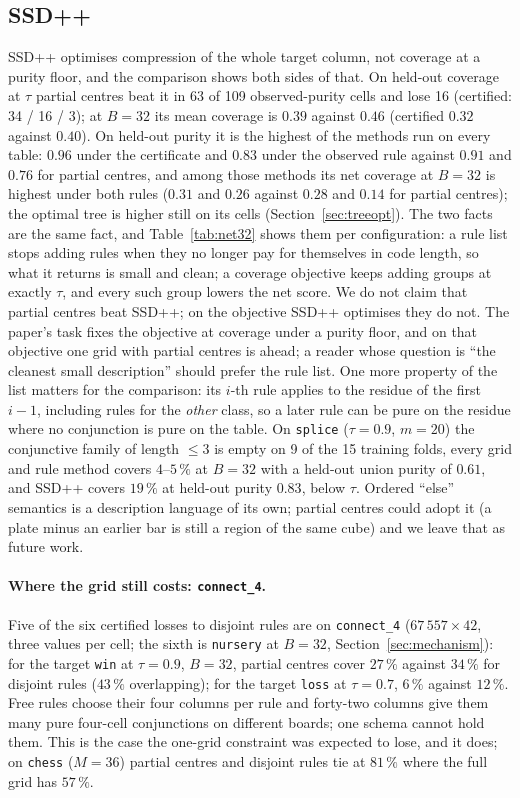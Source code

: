 \documentclass[11pt]{article}
\begin{document}
\subsection{SSD++}\label{sec:ssdpp}
SSD++ optimises compression of the whole target column, not coverage at a purity floor, and the comparison shows both sides of that. On held-out coverage at $\tau$ partial centres beat it in 63 of 109 observed-purity cells and lose 16 (certified: 34 / 16 / 3); at $B=32$ its mean coverage is $0.39$ against $0.46$ (certified $0.32$ against $0.40$). On held-out purity it is the highest of the methods run on every table: $0.96$ under the certificate and $0.83$ under the observed rule against $0.91$ and $0.76$ for partial centres, and among those methods its net coverage at $B=32$ is highest under both rules ($0.31$ and $0.26$ against $0.28$ and $0.14$ for partial centres); the optimal tree is higher still on its cells (Section~\ref{sec:treeopt}). The two facts are the same fact, and Table~\ref{tab:net32} shows them per configuration: a rule list stops adding rules when they no longer pay for themselves in code length, so what it returns is small and clean; a coverage objective keeps adding groups at exactly $\tau$, and every such group lowers the net score. We do not claim that partial centres beat SSD++; on the objective SSD++ optimises they do not. The paper's task fixes the objective at coverage under a purity floor, and on that objective one grid with partial centres is ahead; a reader whose question is ``the cleanest small description'' should prefer the rule list. One more property of the list matters for the comparison: its $i$-th rule applies to the residue of the first $i-1$, including rules for the \emph{other} class, so a later rule can be pure on the residue where no conjunction is pure on the table. On \texttt{splice} ($\tau=0.9$, $m=20$) the conjunctive family of length $\le3$ is empty on 9 of the 15 training folds, every grid and rule method covers $4$--$5\,\%$ at $B=32$ with a held-out union purity of $0.61$, and SSD++ covers $19\,\%$ at held-out purity $0.83$, below $\tau$. Ordered ``else'' semantics is a description language of its own; partial centres could adopt it (a plate minus an earlier bar is still a region of the same cube) and we leave that as future work.

\paragraph{Where the grid still costs: \texttt{connect\_4}.} Five of the six certified losses to disjoint rules are on \texttt{connect\_4} ($67\,557\times42$, three values per cell; the sixth is \texttt{nursery} at $B=32$, Section~\ref{sec:mechanism}): for the target \texttt{win} at $\tau=0.9$, $B=32$, partial centres cover $27\,\%$ against $34\,\%$ for disjoint rules ($43\,\%$ overlapping); for the target \texttt{loss} at $\tau=0.7$, $6\,\%$ against $12\,\%$. Free rules choose their four columns per rule and forty-two columns give them many pure four-cell conjunctions on different boards; one schema cannot hold them. This is the case the one-grid constraint was expected to lose, and it does; on \texttt{chess} ($M=36$) partial centres and disjoint rules tie at $81\,\%$ where the full grid has $57\,\%$.
\end{document}
